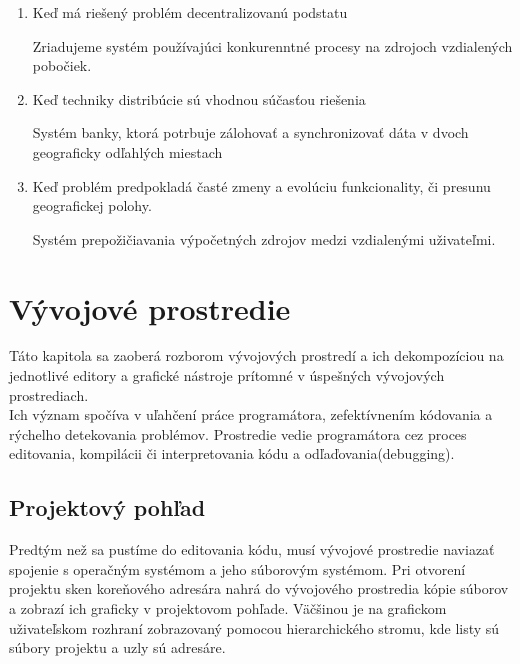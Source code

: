 \begin{enumerate}
	\item Keď má riešený problém decentralizovanú podstatu \\
	\begin{exmpl}
		Zriadujeme systém používajúci konkurenntné procesy na zdrojoch vzdialených pobočiek.
	\end{exmpl}
	\item Keď techniky distribúcie sú vhodnou súčasťou riešenia \\
	\begin{exmpl}
		Systém banky, ktorá potrbuje zálohovať a synchronizovať dáta v dvoch geograficky odľahlých miestach
	\end{exmpl}
	\item Keď problém predpokladá časté zmeny a evolúciu funkcionality, či presunu geografickej polohy. \\
	\begin{exmpl}
		Systém prepožičiavania výpočetných zdrojov medzi vzdialenými uživateľmi.
	\end{exmpl}
\end{enumerate}

\section{Vývojové prostredie}
	Táto kapitola sa zaoberá rozborom vývojových prostredí a ich dekompozíciou na jednotlivé editory a grafické nástroje prítomné v úspešných vývojových prostrediach. \\
	
	Ich význam spočíva v uľahčení práce programátora, zefektívnením kódovania a rýchelho detekovania problémov. Prostredie vedie programátora cez proces editovania, kompilácii či interpretovania kódu a odľaďovania(debugging).
	
	\subsection{Projektový pohľad}
	Predtým než sa pustíme do editovania kódu, musí vývojové prostredie naviazať spojenie s operačným systémom a jeho súborovým systémom. Pri otvorení projektu sken koreňového adresára nahrá do vývojového prostredia kópie súborov a zobrazí ich graficky v projektovom pohľade. Väčšinou je na grafickom uživateľskom rozhraní zobrazovaný pomocou hierarchického stromu, kde listy sú súbory projektu a uzly sú adresáre.
	
